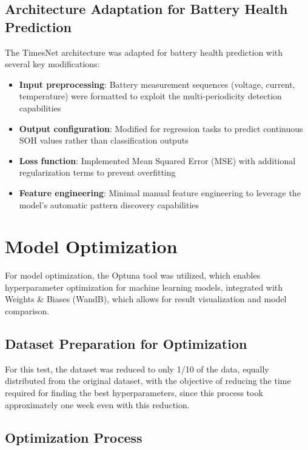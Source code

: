 \subsection{Architecture Adaptation for Battery Health Prediction}

The TimesNet architecture was adapted for battery health prediction with several key modifications:

\begin{itemize}
    \item \textbf{Input preprocessing}: Battery measurement sequences (voltage, current, temperature) were formatted to exploit the multi-periodicity detection capabilities
    \item \textbf{Output configuration}: Modified for regression tasks to predict continuous SOH values rather than classification outputs
    \item \textbf{Loss function}: Implemented Mean Squared Error (MSE) with additional regularization terms to prevent overfitting
    \item \textbf{Feature engineering}: Minimal manual feature engineering to leverage the model's automatic pattern discovery capabilities
\end{itemize}

\section{Model Optimization}

For model optimization, the Optuna tool was utilized, which enables hyperparameter optimization for machine learning models, integrated with Weights \& Biases (WandB), which allows for result visualization and model comparison.

\subsection{Dataset Preparation for Optimization}

For this test, the dataset was reduced to only 1/10 of the data, equally distributed from the original dataset, with the objective of reducing the time required for finding the best hyperparameters, since this process took approximately one week even with this reduction.

\subsection{Optimization Process}

